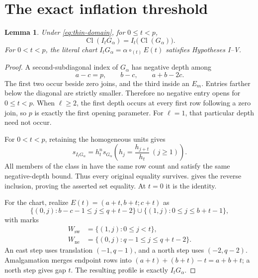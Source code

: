 \documentclass[11pt,a4paper]{amsart}
\numberwithin{equation}{section}
\theoremstyle{plain}
\newtheorem{lemma}[theorem]{Lemma}
\theoremstyle{definition}
\begin{document}
\section{The exact inflation threshold}\label{sec:inflation-proof}

\begin{lemma}\label{lem:subthreshold-transport}
Under \eqref{eq:thin-domain}, for \(0\le t<p\),
\[
 \operatorname{Cl}(I_tG_\alpha)
 =I_t\bigl(\operatorname{Cl}(G_\alpha)\bigr).
\]
For \(0<t<p\), the literal chart
\(I_tG_\alpha=\alpha\circ_{(t)}E(t)\) satisfies Hypotheses I--V.
\end{lemma}

\begin{proof}
A second-subdiagonal index of \(G_\alpha\) has negative depth among
\[
 a-c=p,\qquad b-c,\qquad a+b-2c.
\]
The first two occur beside zero joins, and the third inside an \(E_m\).
Entries farther below the diagonal are strictly smaller.  Therefore no
negative entry opens for \(0\le t<p\).  When \(\ell\ge2\), the
first depth occurs at every first row following a zero join, so \(p\)
is exactly the first opening parameter.  For \(\ell=1\), that
particular depth need not occur.

For \(0<t<p\), retaining the homogeneous units gives
\begin{equation}\label{eq:subthreshold-shift}
 s_{I_tG_\alpha}
 =h_t^n s_{G_\alpha}
 \left(h_j=\frac{h_{j+t}}{h_t}\ (j\ge1)\right).
\end{equation}
All members of the class in  have the
same row count and satisfy the same negative-depth bound.  Thus every
original equality survives.   gives the
reverse inclusion, proving the asserted set equality.  At \(t=0\)
it is the identity.

For the chart, realize \(E(t)=(a+t,b+t;c+t)\) as
\begin{equation}\label{eq:inflation-inner-cells}
 \{(0,j):b-c-1\le j\le q+t-2\}
 \cup\{(1,j):0\le j\le b+t-1\},
\end{equation}
with marks
\begin{equation}\label{eq:inflation-marks}
 \begin{aligned}
 W_{\mathrm{sw}}&=\{(1,j):0\le j<t\},\\
 W_{\mathrm{ne}}&=\{(0,j):q-1\le j\le q+t-2\}.
 \end{aligned}
\end{equation}
An east step uses translation \((-1,q-1)\), and a north step uses
\((-2,q-2)\).  Amalgamation merges endpoint rows into
\((a+t)+(b+t)-t=a+b+t\); a north step gives gap \(t\).
The resulting profile is exactly \(I_tG_\alpha\).


\end{proof}
\end{document}
